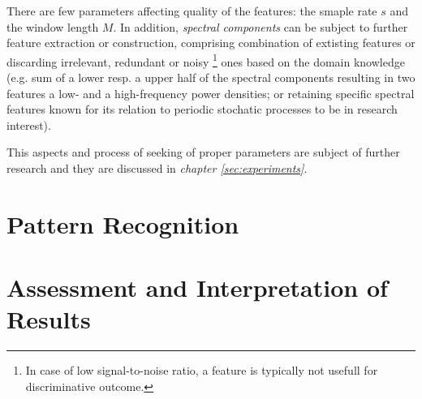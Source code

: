 There are few parameters affecting quality of the  features: %
the smaple rate $s$ and the window length $M$. 
In addition, \emph{spectral components} can be subject to further feature extraction 
or construction, comprising combination of extisting features or discarding irrelevant, 
redundant  or noisy%
\footnote{In case of low signal-to-noise ratio, a feature is typically not usefull 
for discriminative outcome.}%
ones based on the domain knowledge (e.g. sum of a lower resp. a upper half of the 
spectral components resulting in two features a low- and a high-frequency power densities;
or retaining specific spectral features known for its relation to 
periodic stochatic processes to be in research interest).

This aspects and process of seeking of proper parameters are subject of further 
research and they are discussed in \emph{chapter \ref{sec:experiments}}.

\section{Pattern Recognition}

\section{Assessment and Interpretation of Results}

